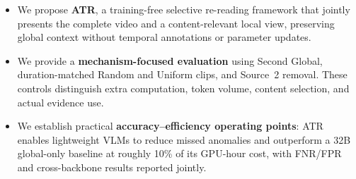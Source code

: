\begin{itemize}
    \item We propose \textbf{ATR}, a training-free selective re-reading framework that jointly presents the complete video and a content-relevant local view, preserving global context without temporal annotations or parameter updates.
    
    \item We provide a \textbf{mechanism-focused evaluation} using Second Global, duration-matched Random and Uniform clips, and Source~2 removal. These controls distinguish extra computation, token volume, content selection, and actual evidence use.
    
    \item We establish practical \textbf{accuracy--efficiency operating points}: ATR enables lightweight VLMs to reduce missed anomalies and outperform a 32B global-only baseline at roughly 10\% of its GPU-hour cost, with FNR/FPR and cross-backbone results reported jointly.
\end{itemize}
